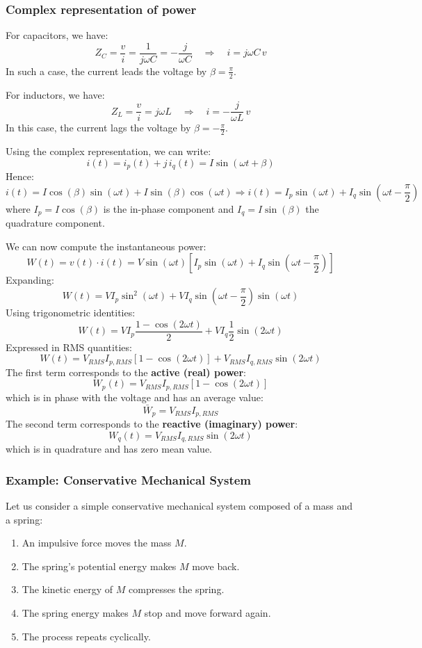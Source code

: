 \subsubsection{Complex representation of power}

For capacitors, we have:
\[
Z_C = \frac{v}{i} = \frac{1}{j \omega C} = -\frac{j}{\omega C}
\quad \Rightarrow \quad i = j \omega C \, v
\]
In such a case, the current leads the voltage by \( \beta = \frac{\pi}{2} \).

For inductors, we have:
\[
Z_L = \frac{v}{i} = j \omega L
\quad \Rightarrow \quad i = -\frac{j}{\omega L} \, v
\]
In this case, the current lags the voltage by \( \beta = -\frac{\pi}{2} \).

Using the complex representation, we can write:
\[
i(t) = i_p(t) + j \, i_q(t) = I \sin(\omega t + \beta)
\]
Hence:
\[
i(t) = I \cos(\beta) \sin(\omega t) + I \sin(\beta) \cos(\omega t)
\Rightarrow i(t) = I_p \sin(\omega t) + I_q \sin\left(\omega t - \frac{\pi}{2}\right)
\]
where \( I_p = I \cos(\beta) \) is the in-phase component and \( I_q = I \sin(\beta) \) the quadrature component.

We can now compute the instantaneous power:
\[
W(t) = v(t) \cdot i(t) = V \sin(\omega t) \left[ I_p \sin(\omega t) + I_q \sin\left(\omega t - \frac{\pi}{2}\right) \right]
\]
Expanding:
\[
W(t) = V I_p \sin^2(\omega t) + V I_q \sin\left(\omega t - \frac{\pi}{2}\right) \sin(\omega t)
\]
Using trigonometric identities:
\[
W(t) = V I_p \frac{1 - \cos(2 \omega t)}{2} + V I_q \frac{1}{2} \sin(2 \omega t)
\]
Expressed in RMS quantities:
\[
W(t) = V_{RMS} I_{p,RMS} [1 - \cos(2 \omega t)] + V_{RMS} I_{q,RMS} \sin(2 \omega t)
\]
The first term corresponds to the \textbf{active (real) power}:
\[
W_p(t) = V_{RMS} I_{p,RMS} [1 - \cos(2 \omega t)]
\]
which is in phase with the voltage and has an average value:
\[
\bar{W}_p = V_{RMS} I_{p,RMS}
\]
The second term corresponds to the \textbf{reactive (imaginary) power}:
\[
W_q(t) = V_{RMS} I_{q,RMS} \sin(2 \omega t)
\]
which is in quadrature and has zero mean value.

\subsubsection{Example: Conservative Mechanical System}

Let us consider a simple conservative mechanical system composed of a mass and a spring:

\begin{enumerate}
    \item An impulsive force moves the mass \( M \).
    \item The spring’s potential energy makes \( M \) move back.
    \item The kinetic energy of \( M \) compresses the spring.
    \item The spring energy makes \( M \) stop and move forward again.
    \item The process repeats cyclically.
\end{enumerate}

